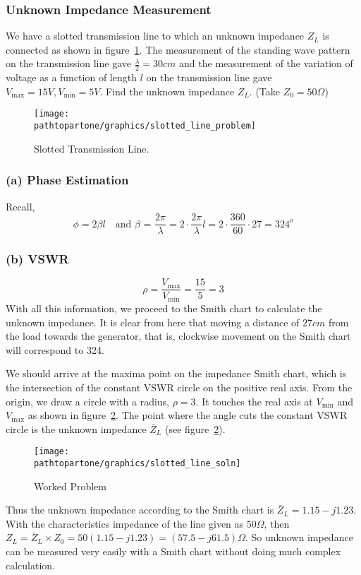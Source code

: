\begin{exmp}
\subsubsection*{Unknown Impedance Measurement}
We have a slotted transmission line to which an unknown impedance $Z_L$ is connected as shown in figure~\ref{fig:fig3}. The measurement of the standing wave pattern on the transmission line gave $\frac{\lambda}{2}=30cm$ and the measurement of the variation of voltage as a function of length $l$ on the transmission line gave $V_\max=15V, V_\min=5V$. Find the unknown impedance $Z_L$. (Take $Z_0 = 50\varOmega$)
\begin{figure}[h]
\centering
\texttt{[image: \\pathtopartone/graphics/slotted\_line\_problem]}
\caption{Slotted Transmission Line.}
\label{fig:fig3}
\end{figure}

\subsubsection*{(a) Phase Estimation}
Recall,
\begin{dmath*}
\phi=2\beta l\quad\text{and }\beta\text{ = }\dfrac{2\pi}{\lambda}
=2\cdot\dfrac{2\pi}{\lambda} l
=2\cdot\dfrac{360}{60}\cdot27
=324^{o}
\end{dmath*}
\subsubsection*{(b) VSWR}
\begin{equation*}
\rho=\frac{V_\max}{V_\min}=\frac{15}{5}=3
\end{equation*}
With all this information, we proceed to the Smith chart to calculate the unknown impedance. It is clear from here that moving a distance of $27cm$ from the load towards the generator, that is, clockwise movement on the Smith chart will correspond to 324\textdegree.

We should arrive at the maxima point on the impedance Smith chart, which is the intersection of the constant VSWR circle on the positive real axis. From the origin, we draw a circle with a radius, $\rho = 3$. It touches the real axis at $V_\min$ and $V_\max$ as shown in figure~\ref{fig:slottedlinesoln}. The point where the angle cuts the constant VSWR circle is the unknown impedance $\bar{Z}_L$ (see figure~\ref{fig:slottedlinesoln}).
\begin{figure}
\centering
\texttt{[image: \\pathtopartone/graphics/slotted\_line\_soln]}
\caption{Worked Problem}
\label{fig:slottedlinesoln}
\end{figure}

Thus the unknown impedance according to the Smith chart is $\bar{Z}_L=1.15-j1.23$. With the characteristics impedance of the line given as $50\varOmega$, then $Z_{L}=\bar{Z}_L\times Z_0 =50(1.15-j1.23)= (57.5-j61.5) \varOmega$. So unknown impedance can be measured very easily with a Smith chart without doing much complex calculation.
\end{exmp}

